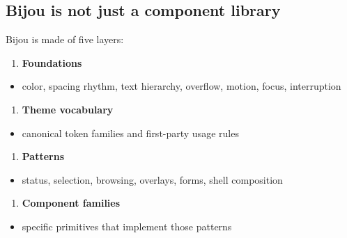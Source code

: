 \subsection{Bijou is not just a component library}\label{record-017-bijou-is-not-just-a-component-library}

Bijou is made of five layers:

\begin{enumerate}
\def\labelenumi{\arabic{enumi}.}
\tightlist
\item
  \textbf{Foundations}
\end{enumerate}

\begin{itemize}
\tightlist
\item
  color, spacing rhythm, text hierarchy, overflow, motion, focus, interruption
\end{itemize}

\begin{enumerate}
\def\labelenumi{\arabic{enumi}.}
\setcounter{enumi}{1}
\tightlist
\item
  \textbf{Theme vocabulary}
\end{enumerate}

\begin{itemize}
\tightlist
\item
  canonical token families and first-party usage rules
\end{itemize}

\begin{enumerate}
\def\labelenumi{\arabic{enumi}.}
\setcounter{enumi}{2}
\tightlist
\item
  \textbf{Patterns}
\end{enumerate}

\begin{itemize}
\tightlist
\item
  status, selection, browsing, overlays, forms, shell composition
\end{itemize}

\begin{enumerate}
\def\labelenumi{\arabic{enumi}.}
\setcounter{enumi}{3}
\tightlist
\item
  \textbf{Component families}
\end{enumerate}

\begin{itemize}
\tightlist
\item
  specific primitives that implement those patterns
\end{itemize}


